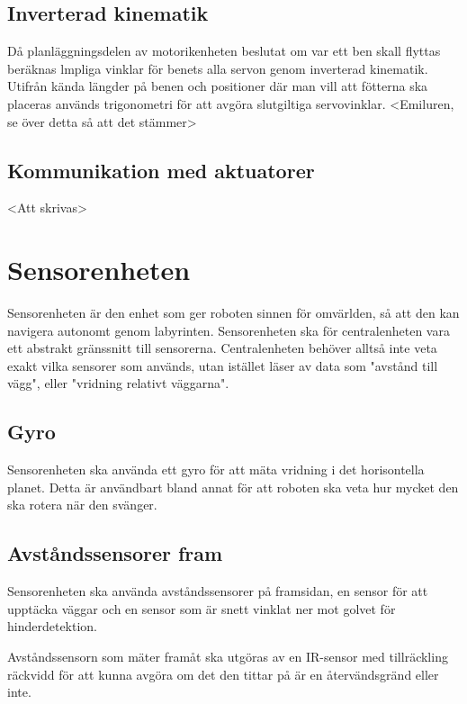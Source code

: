 \documentclass[a4paper,titlepage,12pt]{article}
\begin{document}
	\subsection{Inverterad kinematik}
	Då planläggningsdelen av motorikenheten beslutat om var ett ben skall flyttas beräknas  
	lmpliga vinklar för benets alla servon genom inverterad kinematik. Utifrån kända 
	längder på benen och positioner där man vill att fötterna ska placeras används 
	trigonometri för att avgöra slutgiltiga servovinklar. <Emiluren, se över detta så att det stämmer>

	\subsection{Kommunikation med aktuatorer}
	<Att skrivas>
	
	\section{Sensorenheten}
	
	Sensorenheten är den enhet som ger roboten sinnen för omvärlden, så att den
	kan navigera autonomt genom labyrinten. Sensorenheten ska för
	centralenheten vara ett abstrakt gränssnitt till sensorerna. Centralenheten
	behöver alltså inte veta exakt vilka sensorer som används, utan istället
	läser av data som "avstånd till vägg", eller "vridning relativt väggarna".

	\subsection{Gyro}
	
	Sensorenheten ska använda ett gyro för att mäta vridning i det horisontella
	planet. Detta är användbart bland annat för att roboten ska veta hur mycket
	den ska rotera när den svänger.
	
	\subsection{Avståndssensorer fram}
	
	Sensorenheten ska använda avståndssensorer på framsidan, en sensor för att
	upptäcka väggar och en sensor som är snett vinklat ner mot golvet för hinderdetektion. 

	Avståndssensorn som mäter framåt ska utgöras av en IR-sensor med
	tillräckling räckvidd för att kunna avgöra om det den tittar på är en
	återvändsgränd eller inte.
\end{document}
